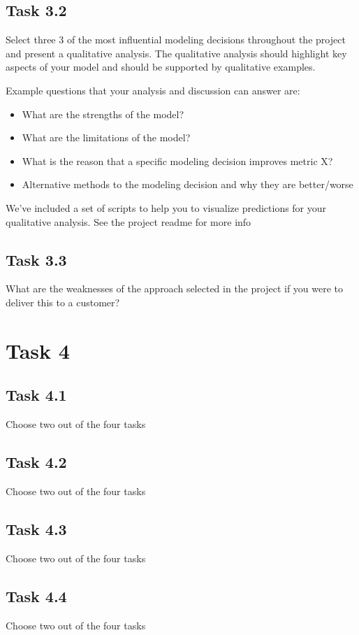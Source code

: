 \documentclass{article}
\begin{document}
\subsection*{Task 3.2}
Select three 3 of the most influential modeling decisions throughout the project and present a qualitative analysis. The qualitative analysis should highlight key aspects of your model and should be supported by qualitative
examples.

Example questions that your analysis and discussion can answer are:
\begin{itemize}
    \item What are the strengths of the model?
    \item What are the limitations of the model?
    \item What is the reason that a specific modeling decision improves metric X?
    \item Alternative methods to the modeling decision and why they are better/worse
\end{itemize}

We’ve included a set of scripts to help you to visualize predictions for your qualitative analysis. See the project
readme for more info

\subsection*{Task 3.3}
What are the weaknesses of the approach selected in the project if you were to deliver this to a customer?

\section*{Task 4}

\subsection*{Task 4.1}
Choose two out of the four tasks

\subsection*{Task 4.2}
Choose two out of the four tasks

\subsection*{Task 4.3}
Choose two out of the four tasks

\subsection*{Task 4.4}
Choose two out of the four tasks



\end{document}
